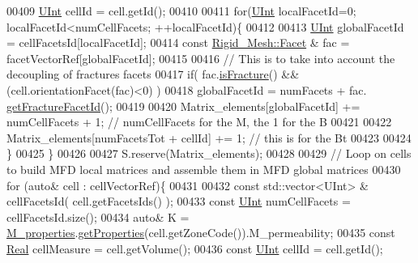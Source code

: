 \begin{DoxyCode}
00409         \hyperlink{namespaceFVCode3D_a4bf7e328c75d0fd504050d040ebe9eda}{UInt} cellId        = cell.getId();
00410 
00411         \textcolor{keywordflow}{for}(\hyperlink{namespaceFVCode3D_a4bf7e328c75d0fd504050d040ebe9eda}{UInt} localFacetId=0; localFacetId<numCellFacets; ++localFacetId)\{       
00412                         
00413                         \hyperlink{namespaceFVCode3D_a4bf7e328c75d0fd504050d040ebe9eda}{UInt} globalFacetId = cellFacetsId[localFacetId];
00414                         \textcolor{keyword}{const} \hyperlink{classFVCode3D_1_1Rigid__Mesh_1_1Facet}{Rigid\_Mesh::Facet} & fac = facetVectorRef[globalFacetId];
00415                         
00416                         \textcolor{comment}{// This is to take into account the decoupling of fractures facets}
00417                         \textcolor{keywordflow}{if}( fac.\hyperlink{classFVCode3D_1_1Rigid__Mesh_1_1Facet_aed3f579d52847e839501f647e90c35ab}{isFracture}() && (cell.orientationFacet(fac)<0) )
00418                                         globalFacetId = numFacets + fac.
      \hyperlink{classFVCode3D_1_1Rigid__Mesh_1_1Facet_a08dc369eccd02b29133187cede7511eb}{getFractureFacetId}();
00419 
00420                         Matrix\_elements[globalFacetId] += numCellFacets + 1;        \textcolor{comment}{// numCellFacets for
       the M, the 1 for the B}
00421 
00422             Matrix\_elements[numFacetsTot + cellId] += 1;                \textcolor{comment}{// this is for the Bt}
00423             
00424         \}
00425     \}
00426     
00427     S.reserve(Matrix\_elements);
00428 
00429     \textcolor{comment}{// Loop on cells to build MFD local matrices and assemble them in MFD global matrices}
00430     \textcolor{keywordflow}{for} (\textcolor{keyword}{auto}& cell : cellVectorRef)\{
00431                 
00432         \textcolor{keyword}{const} std::vector<UInt> & cellFacetsId( cell.getFacetsIds() );
00433         \textcolor{keyword}{const} \hyperlink{namespaceFVCode3D_a4bf7e328c75d0fd504050d040ebe9eda}{UInt} numCellFacets  = cellFacetsId.size();
00434         \textcolor{keyword}{auto}& K = \hyperlink{classFVCode3D_1_1MatrixHandler_ad17a7941b1b8272f50fc6e1c660103fa}{M\_properties}.\hyperlink{classFVCode3D_1_1PropertiesMap_ace888d15c9a4ab13d5e217a3a565604c}{getProperties}(cell.getZoneCode()).M\_permeability;
00435         \textcolor{keyword}{const} \hyperlink{namespaceFVCode3D_a40c1f5588a248569d80aa5f867080e83}{Real} cellMeasure    = cell.getVolume();
00436         \textcolor{keyword}{const} \hyperlink{namespaceFVCode3D_a4bf7e328c75d0fd504050d040ebe9eda}{UInt} cellId         = cell.getId();

\end{DoxyCode}
